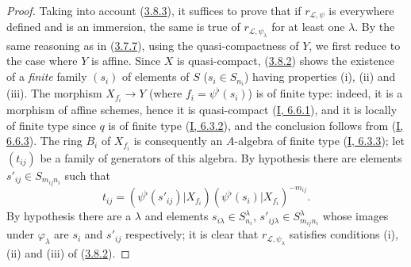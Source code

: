 
\begin{proof}
Taking into account (\hyperref[II.3.8.3]{3.8.3}), it suffices to prove that
if $r_{\mathcal{L},\psi}$ is everywhere defined and is an immersion, the same
is true of $r_{\mathcal{L},\psi_\lambda}$ for at least one $\lambda$. By the
same reasoning as in (\hyperref[II.3.7.7]{3.7.7}), using the
quasi-compactness of $Y$, we first reduce to the case where $Y$ is affine.
Since $X$ is quasi-compact, (\hyperref[II.3.8.2]{3.8.2}) shows the
existence of a \emph{finite} family $(s_i)$ of elements of $S$
($s_i\in S_{n_i}$) having properties (i), (ii) and (iii). The morphism
$X_{f_i}\to Y$ (where $f_i=\psi^\flat(s_i)$) is of finite type: indeed, it
is a morphism of affine schemes, hence it is quasi-compact
(\hyperref[I.6.6.1]{I, 6.6.1}), and it is locally of finite type since $q$
is of finite type (\hyperref[I.6.3.2]{I, 6.3.2}), and the conclusion follows
from (\hyperref[I.6.6.3]{I, 6.6.3}). The ring $B_i$ of $X_{f_i}$ is
consequently an $A$-algebra of finite type (\hyperref[I.6.3.3]{I, 6.3.3});
let $(t_{ij})$ be a family of generators of this algebra. By hypothesis
there are elements $s'_{ij}\in S_{m_{ij}n_i}$ such that
\[
  t_{ij}=(\psi^\flat(s'_{ij})|X_{f_i})
  (\psi^\flat(s_i)|X_{f_i})^{-m_{ij}}.
\]
By hypothesis there are a $\lambda$ and elements
$s_{i\lambda}\in S_{n_i}^\lambda$,
$s'_{ij\lambda}\in S_{m_{ij}n_i}^\lambda$ whose images under
$\varphi_\lambda$ are $s_i$ and $s'_{ij}$ respectively; it is clear that
$r_{\mathcal{L},\psi_\lambda}$ satisfies conditions (i), (ii) and (iii) of
(\hyperref[II.3.8.2]{3.8.2}).
\end{proof}

